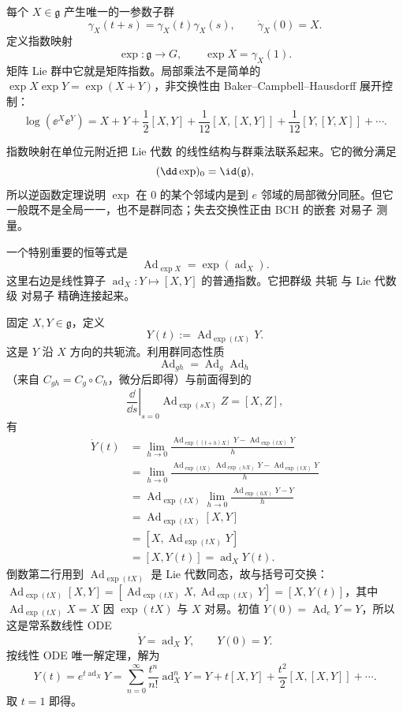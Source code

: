 每个 $X\in\mathfrak g$ 产生唯一的一参数子群
\[
\gamma_X(t+s)=\gamma_X(t)\gamma_X(s),
\qquad
\dot\gamma_X(0)=X.
\]
定义指数映射
\[
\exp:\mathfrak g\to G,
\qquad
\exp X=\gamma_X(1).
\]
矩阵 Lie 群中它就是矩阵指数。局部乘法不是简单的 $\exp X\exp Y=\exp(X+Y)$，非交换性由 Baker--Campbell--Hausdorff 展开控制：
\begin{equation*}\log(\ee^X\ee^Y)
=X+Y+\frac12[X,Y]
+\frac1{12}[X,[X,Y]]
+\frac1{12}[Y,[Y,X]]+\cdots.\end{equation*}

指数映射在单位元附近把 Lie 代数 的线性结构与群乘法联系起来。它的微分满足
\[
(\dd\exp)_0=\id(\mathfrak g),
\]
所以逆函数定理说明 $\exp$ 在 $0$ 的某个邻域内是到 $e$ 邻域的局部微分同胚。但它一般既不是全局一一，也不是群同态；失去交换性正由 BCH 的嵌套 对易子 测量。

一个特别重要的恒等式是
\begin{equation}
\boxed{
\operatorname{Ad}_{\exp X}
=\exp(\operatorname{ad}_X).
}
\label{eq:math-lie-ad-exp}
\end{equation}
这里右边是线性算子 $\operatorname{ad}_X:Y\mapsto[X,Y]$ 的普通指数。它把群级 共轭 与 Lie 代数 级 对易子 精确连接起来。

固定 $X,Y\in\mathfrak g$，定义
\[
Y(t):=\operatorname{Ad}_{\exp(tX)}Y.
\]
这是 $Y$ 沿 $X$ 方向的共轭流。利用群同态性质
\[
\operatorname{Ad}_{gh}=\operatorname{Ad}_g\operatorname{Ad}_h
\]
（来自 $C_{gh}=C_g\circ C_h$，微分后即得）与前面得到的
\[
\left.\frac{\dd}{\dd s}\right|_{s=0}
\operatorname{Ad}_{\exp(sX)}Z
=[X,Z],
\]
有
\[
\begin{aligned}
\dot Y(t)
&=\lim_{h\to0}
\frac{\operatorname{Ad}_{\exp((t+h)X)}Y-
\operatorname{Ad}_{\exp(tX)}Y}{h}\\
&=\lim_{h\to0}
\frac{\operatorname{Ad}_{\exp(tX)}\operatorname{Ad}_{\exp(hX)}Y-
\operatorname{Ad}_{\exp(tX)}Y}{h}\\
&=\operatorname{Ad}_{\exp(tX)}
\lim_{h\to0}\frac{\operatorname{Ad}_{\exp(hX)}Y-Y}{h}\\
&=\operatorname{Ad}_{\exp(tX)}[X,Y]\\
&=[X,\operatorname{Ad}_{\exp(tX)}Y]\\
&=[X,Y(t)]
=\operatorname{ad}_X Y(t).
\end{aligned}
\]
倒数第二行用到 $\operatorname{Ad}_{\exp(tX)}$ 是 Lie 代数同态，故与括号可交换：$\operatorname{Ad}_{\exp(tX)}[X,Y]=[\operatorname{Ad}_{\exp(tX)}X,\operatorname{Ad}_{\exp(tX)}Y]=[X,Y(t)]$，其中 $\operatorname{Ad}_{\exp(tX)}X=X$ 因 $\exp(tX)$ 与 $X$ 对易。初值 $Y(0)=\operatorname{Ad}_{e}Y=Y$，所以这是常系数线性 ODE
\[
\dot Y=\operatorname{ad}_X Y,\qquad Y(0)=Y.
\]
按线性 ODE 唯一解定理，解为
\[
Y(t)=e^{t\operatorname{ad}_X}Y
=\sum_{n=0}^\infty\frac{t^n}{n!}\operatorname{ad}_X^n Y
=Y+t[X,Y]+\frac{t^2}{2}[X,[X,Y]]+\cdots.
\]
取 $t=1$ 即得。


